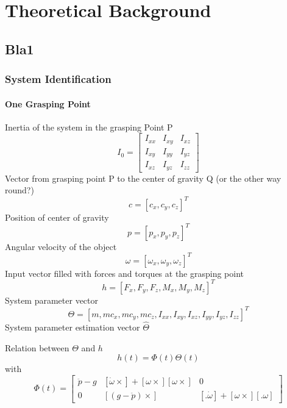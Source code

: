 

\chapter{Theoretical Background}

\section{Bla1}
\label{sec:bla1}
\lipsum[1] 

\subsection{System Identification}
\label{subsec:system_identification}

\subsubsection{One Grasping Point}
Inertia of the system in the grasping Point P
\begin{equation}
	I_0 = 
	\begin{bmatrix}	
		I_{xx}	& I_{xy}	& I_{xz} \\
		I_{xy}	& I_{yy}	& I_{yz} \\
		I_{xz}	& I_{yz}	& I_{zz}
	\end{bmatrix}
\end{equation}
Vector from grasping point P to the center of gravity Q (or the other way round?)
\begin{equation}
	c = [c_x, c_y, c_z]^T
\end{equation}
Position of center of gravity
\begin{equation}
	p = [p_x, p_y, p_z]^T
\end{equation}
Angular velocity of the object
\begin{equation}
	\omega = [\omega_x, \omega_y, \omega_z]^T
\end{equation}
Input vector filled with forces and torques at the grasping point
\begin{equation}
	h = [F_x, F_y, F_z, M_x, M_y, M_z]^T
\end{equation}
System parameter vector
\begin{equation}
	\Theta = [m, m c_x, m c_y, m c_z, I_{xx}, I_{xy}, I_{xz}, I_{yy}, I_{yz}, I_{zz}]^T
\end{equation}
System parameter estimation vector $\hat \Theta$

Relation between $\Theta$ and $h$
\begin{equation}
	h(t) = \Phi(t) \Theta(t)
\end{equation}
with
\begin{equation}
	\Phi(t) = 
	\begin{bmatrix}
		\ddot p - g	& [\dot \omega \times] + [\omega \times] [\omega \times]	& 0 \\
		0			& [(g - \ddot p) \times]									& [. \dot \omega] + [\omega \times] [. \omega]
	\end{bmatrix}
\end{equation}

